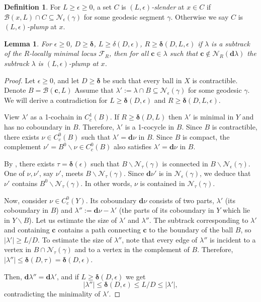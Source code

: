 \documentclass{amsart}
\numberwithin{equation}{section}
\newtheorem{lemma}[theorem]{Lemma}
\theoremstyle{definition}
\newtheorem{definition}[theorem]{Definition}
\newcommand{\bfc}{\mathbf{c}}
\newcommand{\bfd}{\mathbf{d}}
\newcommand{\calB}{\mathcal{B}}
\newcommand{\calF}{\mathcal{F}}
\newcommand{\calN}{\mathcal{N}}
\newcommand{\bdelta}{{\boldsymbol\delta}}
\newcommand{\ssm}{\smallsetminus}
\begin{document}
\begin{definition}\label{def: plump}
    For $L\ge \epsilon\ge 0$, a set $C$ is \emph{$(L,\epsilon)$-slender} at $x\in C$ if $\calB(x,L)\cap C \subseteq \calN_\epsilon(\gamma)$ for some geodesic segment $\gamma$.
    Otherwise we say $C$ is \emph{$(L,\epsilon)$-plump} at $x$.
\end{definition}


\begin{lemma}\label{local minimizers are plump}
    For $\epsilon\ge 0$, $D\ge \bdelta$, $L\ge \delta(D,\epsilon)$, $R\ge \bdelta(D,L,\epsilon)$ if $\lambda$ is a subtrack of the $R$-locally minimal locus $\calF_R$, then for all $\bfc\in \lambda$ such that $\bfc\notin \calN_R(\bfd\lambda)$ the subtrack $\lambda$ is $(L,\epsilon)$-plump at $x$.
\end{lemma}

\begin{proof}
Let $\epsilon \ge 0$, and let $D\ge \bdelta$ be such that every ball in $X$ is contractible.
Denote $B = \calB(\bfc,L)$
Assume that $\lambda' := \lambda\cap B\subseteq \calN_\epsilon (\gamma)$ for some geodesic $\gamma$.
We will derive a contradiction for $L\ge \bdelta(D,\epsilon)$ and $R\ge \bdelta(D,L,\epsilon)$.

View $\lambda'$ as a 1-cochain in $C_c^1(B)$. 
If $R\ge \bdelta(D,L)$ then $\lambda'$ is minimal in $Y$ and has no coboundary in $B$.
Therefore, $\lambda'$ is a 1-cocycle in $B$.
Since $B$ is contractible, there exists $\nu\in C^0_c(B)$ such that $\lambda' =\bfd\nu$ in $B$.
Since $B$ is compact,  the complement $\nu' = B^0\ssm \nu\in C^0_c(B)$ also satisfies $\lambda' = \bfd \nu$ in $B$.


By , there exists $\tau = \bdelta(\epsilon)$ such that $B\ssm \calN_\tau(\gamma)$ is connected in $B\ssm \calN_\epsilon(\gamma)$.
One of $\nu,\nu'$, say $\nu'$, meets $B\ssm \calN_\tau(\gamma)$.
Since $\bfd \nu'$ is in $\calN_\epsilon(\gamma)$, we deduce that $\nu'$ contains $B^0\ssm \calN_\tau(\gamma)$.
In other words, $\nu$ is contained in  $\calN_\tau(\gamma)$.


Now, consider $\nu\in C_c^0(Y)$.
Its coboundary $\bfd\nu$ consists of two parts, $\lambda'$ (its coboundary in $B$) and $\lambda'':=\bfd\nu - \lambda'$ (the parts of its coboundary in $Y$ which lie in $Y\ssm B$).
Let us estimate the size of $\lambda'$ and $\lambda''$.
The subtrack corresponding to $\lambda'$ and containing $\bfc$ contains a path connecting $\bfc$ to the boundary of the ball $B$, so $|\lambda'| \ge  L/D$.
To estimate the size of $\lambda''$, note that every edge of $\lambda''$ is incident to a vertex in $B\cap \calN_\tau(\gamma)$ and to a vertex in the complement of $B$. 
Therefore,  $|\lambda''|\le \bdelta(D,\tau) = \bdelta(D,\epsilon)$.

Then, $\bfd \lambda'' = \bfd \lambda'$, and if $L\ge \bdelta(D,\epsilon)$ we get $$|\lambda''|  \le \bdelta(D,\epsilon) \le L/D \le |\lambda'|,$$
contradicting the minimality of $\lambda'$.
\end{proof}
\end{document}
